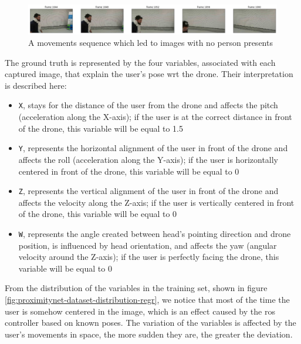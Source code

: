 \begin{figure}[!htb]
\centering
\includegraphics[width=1\textwidth]{"contents/images/03-data-missing"}
\caption[A movements sequence which led to images with no person presents]{A movements sequence which led to images with no person presents}
\label{fig:proximitynet-dataset-missing}
\end{figure}

The ground truth is represented by the four variables, associated with each captured image, that explain the user's pose \gls{wrt} the drone. Their interpretation is described here:

\begin{itemize}
	\item \texttt{X}, stays for the distance of the user from the drone and affects the pitch (acceleration along the X-axis); if the user is at the correct distance in front of the drone, this variable will be equal to 1.5
	\item \texttt{Y}, represents the horizontal alignment of the user in front of the drone and affects the roll (acceleration along the Y-axis); if the user is horizontally centered in front of the drone, this variable will be equal to 0
	\item \texttt{Z}, represents the vertical alignment of the user in front of the drone and affects the velocity along the Z-axis; if the user is vertically centered in front of the drone, this variable will be equal to 0
	\item \texttt{W}, represents the angle created between head's pointing direction and drone position, is influenced by head orientation, and affects the yaw (angular velocity around the Z-axis); if the user is perfectly facing the drone, this variable will be equal to 0
\end{itemize}

From the distribution of the variables in the training set, shown in figure \ref{fig:proximitynet-dataset-distribution-regr}, we notice that most of the time the user is somehow centered in the image, which is an effect caused by the \gls{ros} controller based on known poses. The variation of the variables is affected by the user's movements in space, the more sudden they are, the greater the deviation.

